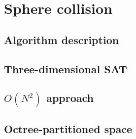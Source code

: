 \chapter{Sphere collision}
\label{cha:spherecollision}

\section{Algorithm description}
\label{sec:spherealgorithmdescription}

\section{Three-dimensional SAT}

\section{{$O(N^2)$} approach}
\label{sec:sphereinitial}

\section{Octree-partitioned space}
\label{sec:sphereoctree}
